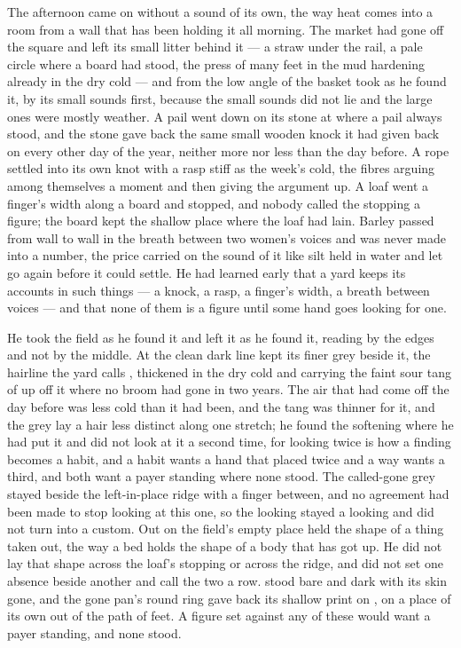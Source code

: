 The afternoon came on without a sound of its own, the way heat comes into a room from a wall that has been holding it all morning. The market had gone off the square and left its small litter behind it --- a straw under the rail, a pale circle where a board had stood, the press of many feet in the mud hardening already in the dry cold --- and from the low angle of the basket  took  as he found it, by its small sounds first, because the small sounds did not lie and the large ones were mostly weather. A pail went down on its stone at  where a pail always stood, and the stone gave back the same small wooden knock it had given back on every other day of the year, neither more nor less than the day before. A rope settled into its own knot with a rasp stiff as the week's cold, the fibres arguing among themselves a moment and then giving the argument up. A loaf went a finger's width along a board and stopped, and nobody called the stopping a figure; the board kept the shallow place where the loaf had lain. Barley passed from wall to wall in the breath between two women's voices and was never made into a number, the price carried on the sound of it like silt held in water and let go again before it could settle. He had learned early that a yard keeps its accounts in such things --- a knock, a rasp, a finger's width, a breath between voices --- and that none of them is a figure until some hand goes looking for one.

He took the field as he found it and left it as he found it, reading by the edges and not by the middle. At  the clean dark line kept its finer grey beside it, the hairline the yard calls , thickened in the dry cold and carrying the faint sour tang of  up off it where no broom had gone in two years. The air that had come off  the day before was less cold than it had been, and the tang was thinner for it, and the grey lay a hair less distinct along one stretch; he found the softening where he had put it and did not look at it a second time, for looking twice is how a finding becomes a habit, and a habit wants a hand that placed twice and a way wants a third, and both want a payer standing where none stood. The called-gone grey stayed beside the left-in-place ridge with a finger between, and no agreement had been made to stop looking at this one, so the looking stayed a looking and did not turn into a custom. Out on  the field's empty place held the shape of a thing taken out, the way a bed holds the shape of a body that has got up. He did not lay that shape across the loaf's stopping or across the ridge, and did not set one absence beside another and call the two a row.  stood bare and dark with its skin gone, and the gone pan's round ring gave back its shallow print on , on a place of its own out of the path of feet. A figure set against any of these would want a payer standing, and none stood.

